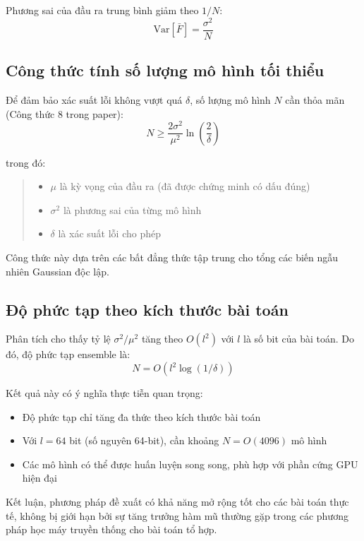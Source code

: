 Phương sai của đầu ra trung bình giảm theo $1/N$:
\begin{equation}
    \text{Var}[\bar{F}] = \frac{\sigma^2}{N}
\end{equation}

\subsection{Công thức tính số lượng mô hình tối thiểu}

Để đảm bảo xác suất lỗi không vượt quá $\delta$, số lượng mô hình $N$ cần thỏa mãn (Công thức 8 trong paper):
\begin{equation}
    N \geq \frac{2\sigma^2}{\mu^2} \ln\left(\frac{2}{\delta}\right)
\end{equation}

trong đó:
\begin{quote}
\begin{itemize}
    \item $\mu$ là kỳ vọng của đầu ra (đã được chứng minh có dấu đúng)
    \item $\sigma^2$ là phương sai của từng mô hình
    \item $\delta$ là xác suất lỗi cho phép
\end{itemize}
\end{quote}

Công thức này dựa trên các bất đẳng thức tập trung cho tổng các biến ngẫu nhiên Gaussian độc lập.

\subsection{Độ phức tạp theo kích thước bài toán}

Phân tích cho thấy tỷ lệ $\sigma^2/\mu^2$ tăng theo $O(l^2)$ với $l$ là số bit của bài toán. Do đó, độ phức tạp ensemble là:
\begin{equation}
    N = O(l^2 \log(1/\delta))
\end{equation}

Kết quả này có ý nghĩa thực tiễn quan trọng:
\begin{itemize}
    \item Độ phức tạp chỉ tăng đa thức theo kích thước bài toán
    \item Với $l = 64$ bit (số nguyên 64-bit), cần khoảng $N = O(4096)$ mô hình
    \item Các mô hình có thể được huấn luyện song song, phù hợp với phần cứng GPU hiện đại
\end{itemize}

Kết luận, phương pháp đề xuất có khả năng mở rộng tốt cho các bài toán thực tế, không bị giới hạn bởi sự tăng trưởng hàm mũ thường gặp trong các phương pháp học máy truyền thống cho bài toán tổ hợp.
